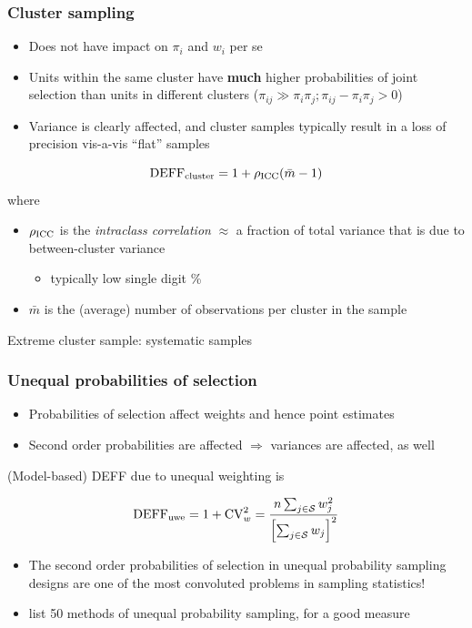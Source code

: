 \documentclass{beamer}
\begin{document}
\begin{frame}\frametitle{Cluster sampling}

\begin{itemize}
    \item Does not have impact on $\pi_i$ and $w_i$ per se
    \item Units within the same cluster have \textbf{much} higher probabilities of joint selection
        than units in different clusters ($\pi_{ij} \gg \pi_i \pi_j; \pi_{ij} - \pi_i \pi_j > 0$)
    \item Variance is clearly affected, and cluster samples typically result in a loss of precision
        vis-a-vis ``flat'' samples
\end{itemize}

$$
{\rm DEFF}_{\rm cluster} = 1 + \rho_{\rm ICC}(\bar m-1)
$$
where
\begin{itemize}
    \item $\rho_{\rm ICC}$ is the \textit{intraclass correlation} $\approx$
        a fraction of total variance that is due to between-cluster variance
        \begin{itemize} \item typically low single digit \% \end{itemize}
    \item $\bar m$ is the (average) number of observations per cluster in the sample
\end{itemize}

Extreme cluster sample: systematic samples

\end{frame}

\begin{frame}\frametitle{Unequal probabilities of selection}

\begin{itemize}
    \item Probabilities of selection affect weights and hence point estimates
    \item Second order probabilities are affected $\Rightarrow$ variances are affected, as well
\end{itemize}

\medskip

(Model-based) DEFF due to unequal weighting is

$$
{\rm DEFF}_{\rm uwe} = 1 + {\rm CV}_w^2 = \frac{n \sum_{j\in\mathcal{S}} w_j^2}{\Bigl[\sum_{j\in\mathcal{S}} w_j\Bigr]^2}
$$

\medskip

\begin{itemize}
    \item The second order probabilities of selection in unequal probability sampling designs
        are one of the most convoluted problems in sampling statistics!
    \item \citet{brewer:hanif:1983} list 50 methods of unequal probability sampling, for a good measure
\end{itemize}


\end{frame}
\end{document}
